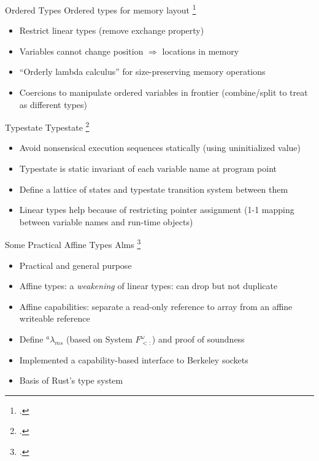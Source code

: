 \documentclass[aspectratio=169]{beamer}
\begin{document}
\begin{frame}{Ordered Types}
  Ordered types for memory layout \footcite{petersen_type_2003}
    \vspace{-0.09in}
    \begin{itemize}
        \item Restrict linear types (remove exchange property)
        \item Variables cannot change position $\Rightarrow$ locations in memory
        \item ``Orderly lambda calculus'' for size-preserving memory operations
        \item Coercions to manipulate ordered variables in frontier (combine/split to treat as different types)
    \end{itemize}
\end{frame}

\begin{frame}{Typestate}
  Typestate \footcite{strom_typestate:_1986}
    \begin{itemize}
        \item Avoid nonsensical execution sequences statically (using uninitialized value)
        \item Typestate is static invariant of each variable name at program point %
        \item Define a lattice of states and typestate transition system between them
        \item Linear types help because of restricting pointer assignment (1-1 mapping between variable names and run-time objects)
    \end{itemize}
\end{frame}

\begin{frame}{Some Practical Affine Types}
  Alms \footcite{tov_practical_2011}
    \begin{itemize}
        \item Practical and general purpose
        \item Affine types: a \emph{weakening} of linear types: can drop but not duplicate
        \item Affine capabilities: separate a read-only reference to array from an affine writeable reference
        \item Define $^{a}\lambda_{ms}$ (based on System $F^{\omega}_{<:}$) and proof of soundness 
        \item Implemented a capability-based interface to Berkeley sockets
        \item Basis of Rust's type system
    \end{itemize}
\end{frame}
\end{document}
